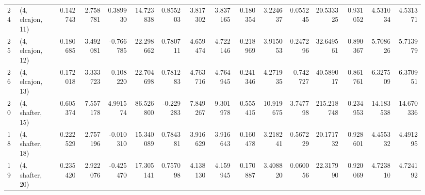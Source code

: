 \begin{tabular}{llrrrrrrrrrrrrrr}
24 &  (4, elcajon, 11) &   0.142743 &  2.758781 &  0.389930 &  14.723838 &  0.855203 &   3.817302 &  3.837165 &  0.180354 &   3.224637 &  0.055245 &   20.533325 &  0.931052 &   4.531034 &   4.531371 \\
25 &  (4, elcajon, 12) &   0.180685 &  3.492081 & -0.766785 &  22.298662 &  0.780711 &   4.659474 &  4.722146 &  0.218969 &   3.915053 &  0.247296 &   32.649561 &  0.890367 &   5.708626 &   5.713979 \\
26 &  (4, elcajon, 13) &   0.172018 &  3.333723 & -0.108220 &  22.704698 &  0.781283 &   4.763716 &  4.764945 &  0.241346 &   4.271935 & -0.742727 &   40.589017 &  0.861761 &   6.327509 &   6.370951 \\
20 &  (4, shafter, 15) &   0.605374 &  7.557178 &  4.991574 &  86.526800 & -0.229283 &   7.849267 &  9.301978 &  0.555415 &  10.919675 &  3.747798 &  215.218748 &  0.234953 &  14.183538 &  14.670336 \\
18 &  (4, shafter, 18) &   0.222529 &  2.757196 & -0.010310 &  15.340089 &  0.784381 &   3.916629 &  3.916643 &  0.160478 &   3.218241 &  0.567229 &   20.171732 &  0.928601 &   4.455332 &   4.491295 \\
19 &  (4, shafter, 20) &   0.235420 &  2.922076 & -0.425470 &  17.305141 &  0.757098 &   4.138130 &  4.159945 &  0.170887 &   3.408820 &  0.060056 &   22.317990 &  0.920069 &   4.723810 &   4.724192 \\
\bottomrule
\end{tabular}
